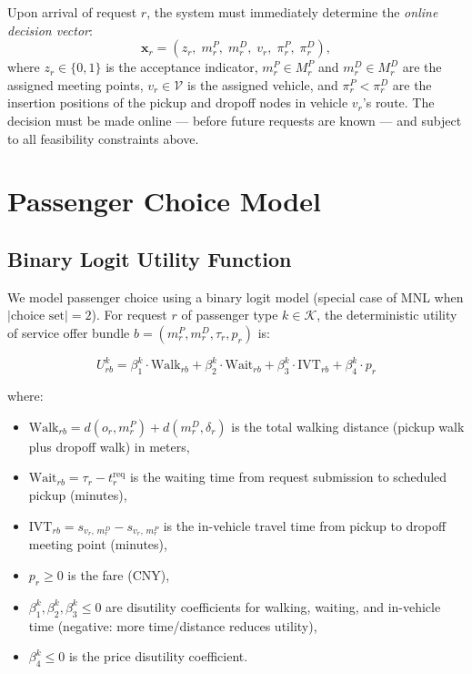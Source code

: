 Upon arrival of request $r$, the system must immediately determine the \emph{online decision
vector}:
\begin{equation}\label{eq:decvec}
  \mathbf{x}_r = (z_r,\; m_r^P,\; m_r^D,\; v_r,\; \pi_r^P,\; \pi_r^D),
\end{equation}
where $z_r \in \{0,1\}$ is the acceptance indicator, $m_r^P \in M_r^P$ and
$m_r^D \in M_r^D$ are the assigned meeting points, $v_r \in \mathcal{V}$ is the assigned
vehicle, and $\pi_r^P < \pi_r^D$ are the insertion positions of the pickup and dropoff
nodes in vehicle $v_r$'s route. The decision must be made online --- before future requests
are known --- and subject to all feasibility constraints above.

\section{Passenger Choice Model}\label{sec:choice}

\subsection{Binary Logit Utility Function}

We model passenger choice using a binary logit model (special case of MNL when $|\text{choice set}| = 2$). For request $r$ of
passenger type $k \in \mathcal{K}$, the deterministic utility of service offer bundle
$b = (m_r^P, m_r^D, \tau_r, p_r)$ is:

\begin{equation}\label{eq:utility}
  U_{rb}^k = \beta_1^k \cdot \text{Walk}_{rb} + \beta_2^k \cdot \text{Wait}_{rb}
           + \beta_3^k \cdot \text{IVT}_{rb} + \beta_4^k \cdot p_r
\end{equation}

where:
\begin{itemize}
  \item $\text{Walk}_{rb} = d(o_r, m_r^P) + d(m_r^D, \delta_r)$ is the total walking
        distance (pickup walk plus dropoff walk) in meters,
  \item $\text{Wait}_{rb} = \tau_r - t_r^{\text{req}}$ is the waiting time from request
        submission to scheduled pickup (minutes),
  \item $\text{IVT}_{rb} = s_{v_r,\, m_r^D} - s_{v_r,\, m_r^P}$ is the in-vehicle travel
        time from pickup to dropoff meeting point (minutes),
  \item $p_r \geq 0$ is the fare (CNY),
  \item $\beta_1^k, \beta_2^k, \beta_3^k \leq 0$ are disutility coefficients for walking,
        waiting, and in-vehicle time (negative: more time/distance reduces utility),
  \item $\beta_4^k \leq 0$ is the price disutility coefficient.
\end{itemize}

